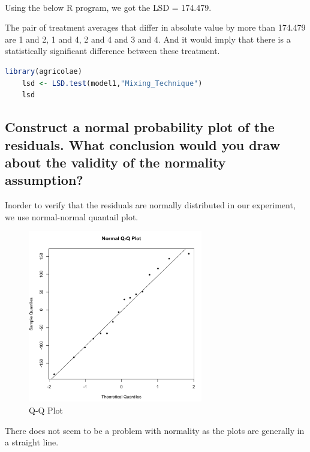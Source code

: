 \documentclass[11pt]{article}
\begin{document}
\paragraph{}
Using the below R program, we got the LSD = 174.479.

The pair of treatment averages that differ in absolute value by more than 174.479 are {1 and 2}, {1 and 4}, {2 and 4} and {3 and 4}.
And it would imply that there is a statistically significant difference between these treatment.

\clearpage

\begin{lstlisting}[language=R]
    library(agricolae)
    lsd <- LSD.test(model1,"Mixing_Technique")
    lsd
\end{lstlisting}



   
\clearpage

\subsection{Construct a normal probability plot of the residuals. What conclusion would you draw about the validity of the normality assumption?}

Inorder to verify that the residuals are normally distributed in our experiment, we use
normal-normal quantail plot. 


\begin{figure}[H]
    \centering
    \includegraphics[width=3.0in]{../pictures/hw2_q1_qqplot.png}
    \caption{Q-Q Plot}
    \label{Q-Q Plot}
\end{figure}

There does not seem to be a problem with normality as the plots are generally in a straight line.
\end{document}
